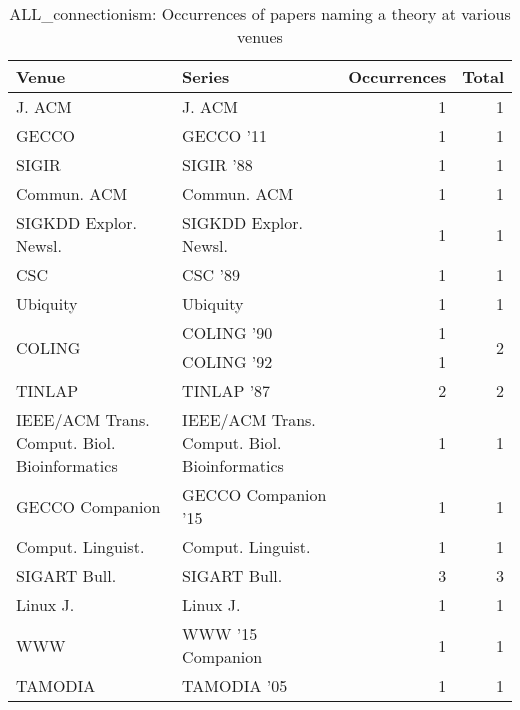 \begin{table*}[t]
\begin{tabular}{llrr}
Venue & Series & Occurrences & Total\\\hline
\multirow{1}{*}{J. ACM} & J. ACM & 1 & \multirow{1}{*}{1}\\
\multirow{1}{*}{GECCO } & GECCO '11 & 1 & \multirow{1}{*}{1}\\
\multirow{1}{*}{SIGIR } & SIGIR '88 & 1 & \multirow{1}{*}{1}\\
\multirow{1}{*}{Commun. ACM} & Commun. ACM & 1 & \multirow{1}{*}{1}\\
\multirow{1}{*}{SIGKDD Explor. Newsl.} & SIGKDD Explor. Newsl. & 1 & \multirow{1}{*}{1}\\
\multirow{1}{*}{CSC } & CSC '89 & 1 & \multirow{1}{*}{1}\\
\multirow{1}{*}{Ubiquity} & Ubiquity & 1 & \multirow{1}{*}{1}\\
\multirow{2}{*}{COLING } & COLING '90 & 1 & \multirow{2}{*}{2}\\
& COLING '92 & 1 &\\
\multirow{1}{*}{TINLAP } & TINLAP '87 & 2 & \multirow{1}{*}{2}\\
\multirow{1}{*}{IEEE/ACM Trans. Comput. Biol. Bioinformatics} & IEEE/ACM Trans. Comput. Biol. Bioinformatics & 1 & \multirow{1}{*}{1}\\
\multirow{1}{*}{GECCO Companion } & GECCO Companion '15 & 1 & \multirow{1}{*}{1}\\
\multirow{1}{*}{Comput. Linguist.} & Comput. Linguist. & 1 & \multirow{1}{*}{1}\\
\multirow{1}{*}{SIGART Bull.} & SIGART Bull. & 3 & \multirow{1}{*}{3}\\
\multirow{1}{*}{Linux J.} & Linux J. & 1 & \multirow{1}{*}{1}\\
\multirow{1}{*}{WWW } & WWW '15 Companion & 1 & \multirow{1}{*}{1}\\
\multirow{1}{*}{TAMODIA } & TAMODIA '05 & 1 & \multirow{1}{*}{1}\\
\end{tabular}
\caption{ALL\_connectionism: Occurrences of papers naming a theory at various venues}
\end{table*}